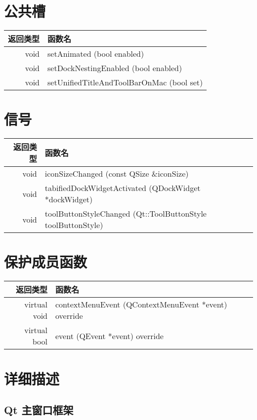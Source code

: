 \section{公共槽}

\begin{tabular}{|r|l|}
\hline
返回类型 &	函数名 \\
\hline
void 	&setAnimated (bool enabled) \\ 
\hline
void 	&setDockNestingEnabled (bool enabled) \\
\hline
void 	&setUnifiedTitleAndToolBarOnMac (bool set) \\
\hline
\end{tabular}

\section{信号}

\begin{tabular}{|r|l|}
    \hline
    返回类型 &	函数名 \\
    \hline
    void &	iconSizeChanged (const QSize \&iconSize) \\ 
    \hline
    void &	tabifiedDockWidgetActivated (QDockWidget *dockWidget) \\ 
    \hline
    void &	toolButtonStyleChanged (Qt::ToolButtonStyle toolButtonStyle) \\
    \hline
\end{tabular}

\section{保护成员函数}

\begin{tabular}{|r|l|}
\hline
返回类型 &	函数名 \\
\hline
virtual void &	contextMenuEvent (QContextMenuEvent *event) override \\
\hline
virtual bool &	event (QEvent *event) override \\
\hline
\end{tabular}

\section{详细描述}
\subsection{Qt 主窗口框架}

